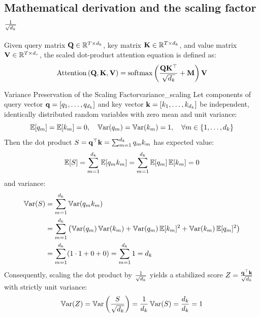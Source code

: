 \documentclass[../labs.tex]{subfiles}
\begin{document}
\subsection{Mathematical derivation and the scaling factor $\frac{1}{\sqrt{d_k}}$}

Given query matrix $\mathbf{Q} \in \mathbb{R}^{T \times d_k}$, key matrix $\mathbf{K} \in \mathbb{R}^{T \times d_k}$, and value matrix $\mathbf{V} \in \mathbb{R}^{T \times d_v}$, the scaled dot-product attention equation is defined as:
\begin{equation}
    \operatorname{Attention}\left(\mathbf{Q}, \mathbf{K}, \mathbf{V}\right) = \operatorname{\mathrm{softmax}}\left(\frac{\mathbf{Q} \mathbf{K}^\top}{\sqrt{d_k}} + \mathbf{M}\right) \mathbf{V}
    \label{eq:scaled_dot_prod_attn}
\end{equation}

\begin{theorem}{Variance Preservation of the Scaling Factor}{variance_scaling}
Let components of query vector $\mathbf{q} = [q_1, \dots, q_{d_k}]$ and key vector $\mathbf{k} = [k_1, \dots, k_{d_k}]$ be independent, identically distributed random variables with zero mean and unit variance:
\begin{equation}
    \operatorname*{\mathbb{E}}[q_m] = \operatorname*{\mathbb{E}}[k_m] = 0, \quad \operatorname{\mathbb{V}\mathrm{ar}}(q_m) = \operatorname{\mathbb{V}\mathrm{ar}}(k_m) = 1, \quad \forall m \in \{1, \dots, d_k\}
\end{equation}
Then the dot product $S = \mathbf{q}^\top \mathbf{k} = \sum_{m=1}^{d_k} q_m k_m$ has expected value:
\begin{equation}
    \operatorname*{\mathbb{E}}[S] = \sum_{m=1}^{d_k} \operatorname*{\mathbb{E}}[q_m k_m] = \sum_{m=1}^{d_k} \operatorname*{\mathbb{E}}[q_m] \operatorname*{\mathbb{E}}[k_m] = 0
\end{equation}
and variance:
\begin{align}
    \operatorname{\mathbb{V}\mathrm{ar}}(S) &= \sum_{m=1}^{d_k} \operatorname{\mathbb{V}\mathrm{ar}}(q_m k_m) \nonumber \\
    &= \sum_{m=1}^{d_k} \left(\operatorname{\mathbb{V}\mathrm{ar}}(q_m)\operatorname{\mathbb{V}\mathrm{ar}}(k_m) + \operatorname{\mathbb{V}\mathrm{ar}}(q_m)\operatorname*{\mathbb{E}}[k_m]^2 + \operatorname{\mathbb{V}\mathrm{ar}}(k_m)\operatorname*{\mathbb{E}}[q_m]^2\right) \nonumber \\
    &= \sum_{m=1}^{d_k} (1 \cdot 1 + 0 + 0) = \sum_{m=1}^{d_k} 1 = d_k
\end{align}
Consequently, scaling the dot product by $\frac{1}{\sqrt{d_k}}$ yields a stabilized score $Z = \frac{\mathbf{q}^\top \mathbf{k}}{\sqrt{d_k}}$ with strictly unit variance:
\begin{equation}
    \operatorname{\mathbb{V}\mathrm{ar}}(Z) = \operatorname{\mathbb{V}\mathrm{ar}}\left(\frac{S}{\sqrt{d_k}}\right) = \frac{1}{d_k} \operatorname{\mathbb{V}\mathrm{ar}}(S) = \frac{d_k}{d_k} = 1
\end{equation}
\end{theorem}
\end{document}
